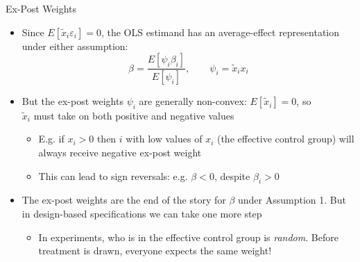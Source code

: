 \documentclass[11pt,english]{beamer}
\begin{document}
\begin{frame}{Ex-Post Weights}

\begin{itemize}
\item Since $E[\tilde{x}_i\varepsilon_i]=0$, the OLS estimand has an average-effect representation under either assumption:
\begin{equation*}
\beta= \frac{E[\psi_i\beta_i]}{E[\psi_i]},\quad\quad \psi_i=\tilde{x}_ix_i
\end{equation*}
\pause{}

\item But the ex-post weights $\psi_i$ are generally non-convex: $E[\tilde{x}_i]=0$, so \\ $\tilde{x}_i$ must take on both positive and negative values\smallskip \pause{}
\begin{itemize}
\item E.g. if $x_i>0$ then $i$ with low values of $x_i$ (the effective control group) will always receive negative ex-post weight\smallskip\pause{}
\item This can lead to sign reversals: e.g. $\beta<0$, despite $\beta_i>0$
\end{itemize}
\bigskip\pause{}

\item The ex-post weights are the end of the story for $\beta$ under Assumption 1. But in design-based specifications we can take one more step\smallskip
\begin{itemize}
\item In experiments, who is in the effective control group is \emph{random}. Before treatment is drawn, everyone expects the same weight!
\end{itemize}
\end{itemize}

\end{frame}
\end{document}
